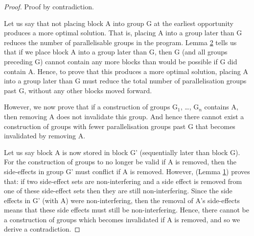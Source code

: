 \begin{proof}
  Proof by contradiction.

  Let us say that not placing block A into group G at the earliest opportunity produces a more optimal solution. That is, placing A into a group later than G reduces the number of parallelisable groups in the program. Lemma \hyperref[lemma:two]{2} tells us that if we place block A into a group later than G, then G (and all groups preceding G) cannot contain any more blocks than would be possible if G did contain A. Hence, to prove that this produces a more optimal solution, placing A into a group later than G must reduce the total number of parallelisation groups past G, without any other blocks moved forward. 

  However, we now prove that if a construction of groups G\(_1\), \ldots, G\(_n\) contains A, then removing A does not invalidate this group. And hence there cannot exist a construction of groups with fewer parallelisation groups past G that becomes invalidated by removing A. 

  Let us say block A is now stored in block G' (sequentially later than block G). For the construction of groups to no longer be valid if A is removed, then the side-effects in group G' must conflict if A is removed. However, (Lemma \hyperref[lemma:one]{1}) proves that: if two side-effect sets are non-interfering and a side effect is removed from one of these side-effect sets then they are still non-interfering. Since the side effects in G' (with A) were non-interfering, then the removal of A's side-effects means that these side effects must still be non-interfering. Hence, there cannot be a construction of groups which becomes invalidated if A is removed, and so we derive a contradiction. 
\end{proof}